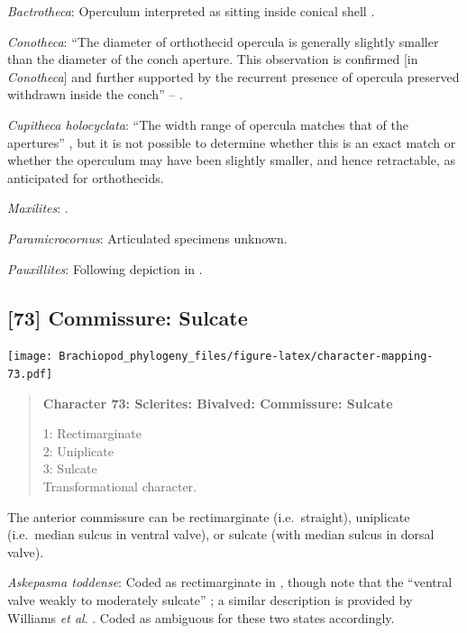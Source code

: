 \documentclass[openany]{book}
\begin{document}
\hypertarget{Bactrotheca-coding-72}{}
\emph{Bactrotheca}: Operculum interpreted as sitting inside conical
shell \citep{Marek1976}.

\hypertarget{Conotheca-coding-72}{}
\emph{Conotheca}: ``The diameter of orthothecid opercula is generally
slightly smaller than the diameter of the conch aperture. This
observation is confirmed {[}in \emph{Conotheca}{]} and further supported
by the recurrent presence of opercula preserved withdrawn inside the
conch'' -- \citet{Devaere2014}.

\hypertarget{Cupitheca_holocyclata-coding-72}{}
\emph{Cupitheca holocyclata}: ``The width range of opercula matches that
of the apertures'' \citep{Sun2018}, but it is not possible to determine
whether this is an exact match or whether the operculum may have been
slightly smaller, and hence retractable, as anticipated for
orthothecids.

\hypertarget{Maxilites-coding-72}{}
\emph{Maxilites}: \citet{MartiMus2005}.

\hypertarget{Paramicrocornus-coding-72}{}
\emph{Paramicrocornus}: Articulated specimens unknown.

\hypertarget{Pauxillites-coding-72}{}
\emph{Pauxillites}: Following depiction in \citet{Marek1976}.

\subsection*{{[}73{]} Commissure: Sulcate}\label{commissure-sulcate}

\texttt{[image: Brachiopod\_phylogeny\_files/figure-latex/character-mapping-73.pdf]}

\begin{quote}
\textbf{Character 73: Sclerites: Bivalved: Commissure: Sulcate}

1: Rectimarginate\\
2: Uniplicate\\
3: Sulcate\\
Transformational character.
\end{quote}

The anterior commissure can be rectimarginate (i.e.~straight),
uniplicate (i.e.~median sulcus in ventral valve), or sulcate (with
median sulcus in dorsal valve).

\hypertarget{Askepasma_toddense-coding-73}{}
\emph{Askepasma toddense}: Coded as rectimarginate in
\citet{Williams1998Thediversity}, though note that the ``ventral valve
weakly to moderately sulcate'' \citep{Topper2013Theoldest}; a similar
description is provided by Williams \emph{et al}.
\citeyearpar{Williams2000LinguliformeaCraniiformea}. Coded as ambiguous
for these two states accordingly.
\end{document}

